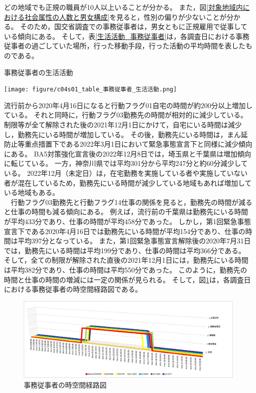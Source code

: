 \documentclass[paper={210mm,297mm},line_length=35zw,number_of_lines=31,head_space=30mm,gutter=40mm,baselineskip=2.0zw,headfoot_verticalposition=1.5zw]{jlreq} %
\begin{document}
どの地域でも正規の職員が10人以上いることが分かる。
また，図\ref{対象地域内における社会属性の人数と男女構成}を見ると，性別の偏りが少ないことが分かる。
そのため，国交省調査での事務従事者は，男女ともに正規雇用で従事している傾向にある。
そして，表\ref{生活活動_事務従事者}は，各調査日における事務従事者の過ごしていた場所，行った移動手段，行った活動の平均時間を表したものである。\\

\begin{table}[H]
  \centering
  \caption{事務従事者の生活活動}
  \texttt{[image: figure/c04s01\_table\_事務従事者\_生活活動.png]}
  \label{生活活動_事務従事者}
\end{table}

流行前から2020年4月16日になると行動フラグ01自宅の時間が約200分以上増加している。
それと同時に，行動フラグ03勤務先の時間が相対的に減少している。
制限等が全て解除された後の2021年12月1日にかけて，自宅にいる時間は減少し，勤務先にいる時間が増加している。
その後，勤務先にいる時間は，まん延防止等重点措置下である2022年3月1日において緊急事態宣言下と同様に減少傾向にある。
BA5対策強化宣言後の2022年12月8日では，埼玉県と千葉県は増加傾向に転じている。
一方，神奈川県では平均301分から平均247分と約60分減少している。
2022年12月（未定日）は，在宅勤務を実施している者や実施していない者が混在しているため，勤務先にいる時間が減少している地域もあれば増加している地域もある。\\
　行動フラグ03勤務先と行動フラグ14仕事の関係を見ると，勤務先の時間が減ると仕事の時間も減る傾向にある。
例えば，流行前の千葉県は勤務先にいる時間が平均433分であり、仕事の時間が平均458分であった。
しかし，第1回緊急事態宣言下である2020年4月16日では勤務先にいる時間が平均154分であり、仕事の時間は平均397分となっている。
また，第1回緊急事態宣言解除後の2020年7月31日では，勤務先にいる時間は平均199分であり、仕事の時間は平均366分である。
そして，全ての制限が解除された直後の2021年12月1日には，勤務先にいる時間は平均382分であり、仕事の時間は平均550分であった。
このように，勤務先の時間と仕事の時間の増減には一定の関係が見られる。
そして，図\ref{時空間経路図_事務従事者}は，各調査日における事務従事者の時空間経路図である。\\

\begin{figure}[H]
  \centering
  \includegraphics[scale=0.4]{figure/c04s01_fig_事務従事者_時空間経路図.png}
  \caption{事務従事者の時空間経路図}
  \label{時空間経路図_事務従事者}
\end{figure}
\end{document}
